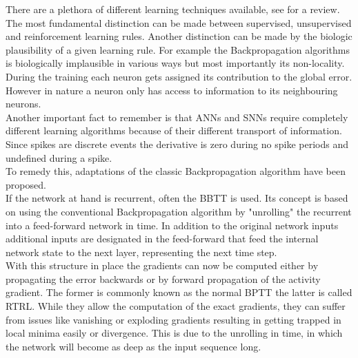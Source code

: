 	There are a plethora of different learning techniques available, see \cite{abdolrasol_artificial_2021}\cite{sun_survey_2019} for a review. The most fundamental distinction can be made between supervised, unsupervised and reinforcement learning rules.
	Another distinction can be made by the biologic plausibility of a given learning rule. For example the Backpropagation algorithms is biologically implausible in various ways but most importantly its non-locality. During the training each neuron gets assigned its contribution to the global error. However in nature a neuron only has access to information to its neighbouring neurons.\\
	Another important fact to remember is that \acp{ANN} and \acp{SNN} require completely different learning algorithms because of their different transport of information. Since spikes are discrete events the derivative is zero during no spike periods and undefined during a spike.\\
	To remedy this, adaptations of the classic Backpropagation algorithm have been proposed.\\
	If the network at hand is recurrent, often the \ac{BBTT} is used. Its concept is based on using the conventional Backpropagation algorithm by "unrolling" the recurrent into a feed-forward network in time. In addition to the original network inputs additional inputs are designated in the feed-forward that feed the internal network state to the next layer, representing the next time step.\\
	With this structure in place the gradients can now be computed either by propagating the error backwards or by forward propagation of the activity gradient. The former is commonly known as the normal \ac{BPTT} the latter is called \ac{RTRL}\cite{williams_gradient-based_1995}. While they allow the computation of the exact gradients, they can suffer from issues like vanishing or exploding gradients \cite{pascanu_difficulty_2013}\cite{bengio_learning_1994} resulting in getting trapped in local minima easily or divergence. This is due to the unrolling in time, in which the network will become as deep as the input sequence long.\\

